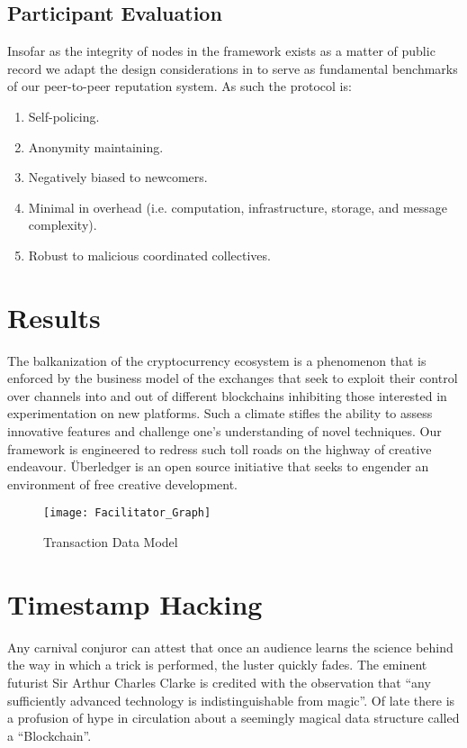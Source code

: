 \subsection{Participant Evaluation}
Insofar as the integrity of nodes in the framework exists as a matter of public record we adapt the design considerations in \cite{kamvar2003eigentrust} to serve as fundamental benchmarks of our peer-to-peer reputation system.
As such the protocol is: 
\begin{enumerate}
  \item Self-policing. 
  \item Anonymity maintaining.
  \item Negatively biased to newcomers.
  \item Minimal in overhead (i.e. computation, infrastructure, storage, and message complexity).
  \item Robust to malicious coordinated collectives.
\end{enumerate}

\section{Results}
The balkanization of the cryptocurrency ecosystem is a phenomenon that is enforced by the business model of the exchanges that seek to exploit their control over channels into and out of different blockchains inhibiting those interested in experimentation on new platforms. Such a climate stifles the ability to assess innovative features and challenge one's understanding of novel techniques. 
Our framework is engineered to redress such toll roads on the highway of creative endeavour.
\"{U}berledger is an open source initiative that seeks to engender an environment of free creative development.

\begin{figure}
\centering
\texttt{[image: Facilitator\_Graph]}
\caption{Transaction Data Model}
\end{figure}


\section{Timestamp Hacking}

Any carnival conjuror can attest that once an audience learns the science behind the way in which a trick is performed, the luster quickly fades. 
The eminent futurist Sir Arthur Charles Clarke is credited with the observation that ``any sufficiently advanced technology is indistinguishable from magic''. 
Of late there is a profusion of hype in circulation about a seemingly magical data structure called a ``Blockchain''. 

